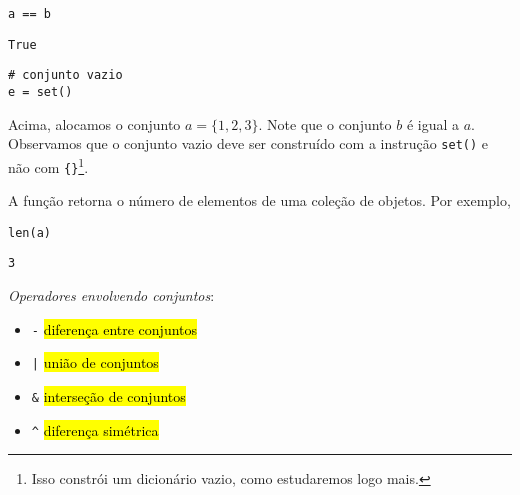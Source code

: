 \documentclass[12pt]{article}
\begin{document}
\begin{lstlisting}
a == b
\end{lstlisting}

\begin{verbatim}
True
\end{verbatim}

\begin{lstlisting}
# conjunto vazio
e = set()  
\end{lstlisting}

Acima, alocamos o conjunto $a = \{1,2, 3\}$. Note que o conjunto $b$ é igual a $a$. Observamos que o conjunto vazio deve ser construído com a instrução \texttt{set()} e não com \lstinline+{}+\footnote{Isso constrói um dicionário vazio, como estudaremos logo mais.}.

\begin{obs}
  A função {\PYTHONlen} retorna o número de elementos de uma coleção de objetos. Por exemplo,
  
\begin{lstlisting}
len(a)
\end{lstlisting}

\begin{verbatim}
3
\end{verbatim}

\end{obs}

\emph{Operadores envolvendo conjuntos}:
\begin{itemize}
\item[] \lstinline+-+ \hl{diferença entre conjuntos}
\item[] \lstinline+|+ \hl{união de conjuntos}
\item[] \lstinline+&+ \hl{interseção de conjuntos}
\item[] \lstinline+^+ \hl{diferença simétrica}
\end{itemize}
\end{document}
